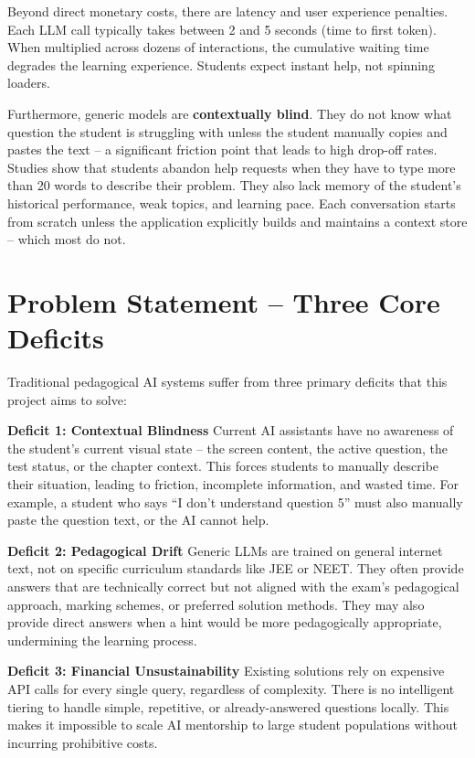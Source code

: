 Beyond direct monetary costs, there are latency and user experience penalties. Each LLM call typically takes between 2 and 5 seconds (time to first token). When multiplied across dozens of interactions, the cumulative waiting time degrades the learning experience. Students expect instant help, not spinning loaders.

Furthermore, generic models are \textbf{contextually blind}. They do not know what question the student is struggling with unless the student manually copies and pastes the text – a significant friction point that leads to high drop-off rates. Studies show that students abandon help requests when they have to type more than 20 words to describe their problem. They also lack memory of the student's historical performance, weak topics, and learning pace. Each conversation starts from scratch unless the application explicitly builds and maintains a context store – which most do not.

\section{Problem Statement – Three Core Deficits}

Traditional pedagogical AI systems suffer from three primary deficits that this project aims to solve:

\textbf{Deficit 1: Contextual Blindness}  
Current AI assistants have no awareness of the student's current visual state – the screen content, the active question, the test status, or the chapter context. This forces students to manually describe their situation, leading to friction, incomplete information, and wasted time. For example, a student who says ``I don't understand question 5'' must also manually paste the question text, or the AI cannot help.

\textbf{Deficit 2: Pedagogical Drift}  
Generic LLMs are trained on general internet text, not on specific curriculum standards like JEE or NEET. They often provide answers that are technically correct but not aligned with the exam's pedagogical approach, marking schemes, or preferred solution methods. They may also provide direct answers when a hint would be more pedagogically appropriate, undermining the learning process.

\textbf{Deficit 3: Financial Unsustainability}  
Existing solutions rely on expensive API calls for every single query, regardless of complexity. There is no intelligent tiering to handle simple, repetitive, or already-answered questions locally. This makes it impossible to scale AI mentorship to large student populations without incurring prohibitive costs.
\newpage

